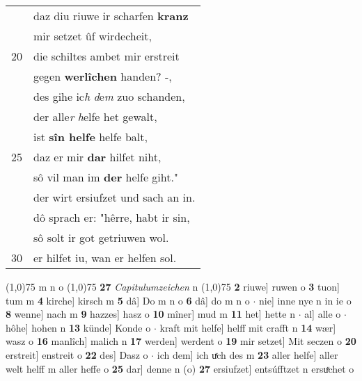 \documentclass[8pt,a4paper,notitlepage]{article}
\begin{document}
\begin{table}[ht]
\begin{minipage}[t]{0.5\linewidth}
\begin{tabular}{rl}
 & daz diu riuwe ir scharfen \textbf{kranz}\\ 
 & mir setzet ûf wirdecheit,\\ 
20 & die schiltes ambet mir erstreit\\ 
 & gegen \textbf{werlîchen} handen? -,\\ 
 & des gihe ic\textit{h} \textit{d}e\textit{m} zuo schanden,\\ 
 & der alle\textit{r} \textit{h}elfe het gewalt,\\ 
 & ist \textbf{sîn helfe} helfe balt,\\ 
25 & daz er mir \textbf{dar} hilfet niht,\\ 
 & sô vil man im \textbf{der} helfe giht."\\ 
 & der wirt ersiufzet und sach an in.\\ 
 & dô sprach er: "hêrre, habt ir sin,\\ 
 & sô solt ir got getriuwen wol.\\ 
30 & er hilfet iu, wan er helfen sol.\\ 
\end{tabular}
\scriptsize
\line(1,0){75} \newline
m n o \newline
\line(1,0){75} \newline
\textbf{27} \textit{Capitulumzeichen} n  \newline
\line(1,0){75} \newline
\textbf{2} riuwe] ruwen o \textbf{3} tuon] tum m \textbf{4} kirche] kirsch m \textbf{5} dâ] Do m n o \textbf{6} dâ] do m n o  $\cdot$ nie] inne nye n in ie o \textbf{8} wenne] nach m \textbf{9} hazzes] hasz o \textbf{10} mîner] mud m \textbf{11} het] hette n  $\cdot$ al] alle o  $\cdot$ hôhe] hohen n \textbf{13} künde] Konde o  $\cdot$ kraft mit helfe] helff mit crafft n \textbf{14} wær] wasz o \textbf{16} manlîch] malich n \textbf{17} werden] werdent o \textbf{19} mir setzet] Mit seczen o \textbf{20} erstreit] enstreit o \textbf{22} des] Dasz o  $\cdot$ ich dem] ich uͯch des m \textbf{23} aller helfe] aller welt helff m aller heffe o \textbf{25} dar] denne n (o) \textbf{27} ersiufzet] entsúfftzet n ersuͯchet o \newline
\end{minipage}
\end{table}
\newpage
\end{document}
